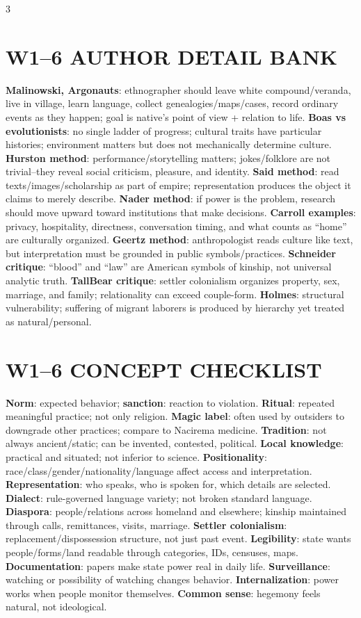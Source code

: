 \documentclass[10pt,landscape]{article}
\newcommand{\kw}[1]{\textbf{#1}}
\begin{document}
\begin{multicols}{3}
\section*{W1--6 AUTHOR DETAIL BANK}
\kw{Malinowski, Argonauts}: ethnographer should leave white compound/veranda, live in village, learn language, collect genealogies/maps/cases, record ordinary events as they happen; goal is native's point of view + relation to life. \kw{Boas vs evolutionists}: no single ladder of progress; cultural traits have particular histories; environment matters but does not mechanically determine culture. \kw{Hurston method}: performance/storytelling matters; jokes/folklore are not trivial--they reveal social criticism, pleasure, and identity. \kw{Said method}: read texts/images/scholarship as part of empire; representation produces the object it claims to merely describe. \kw{Nader method}: if power is the problem, research should move upward toward institutions that make decisions. \kw{Carroll examples}: privacy, hospitality, directness, conversation timing, and what counts as ``home'' are culturally organized. \kw{Geertz method}: anthropologist reads culture like text, but interpretation must be grounded in public symbols/practices. \kw{Schneider critique}: ``blood'' and ``law'' are American symbols of kinship, not universal analytic truth. \kw{TallBear critique}: settler colonialism organizes property, sex, marriage, and family; relationality can exceed couple-form. \kw{Holmes}: structural vulnerability; suffering of migrant laborers is produced by hierarchy yet treated as natural/personal.

\section*{W1--6 CONCEPT CHECKLIST}
\kw{Norm}: expected behavior; \kw{sanction}: reaction to violation. \kw{Ritual}: repeated meaningful practice; not only religion. \kw{Magic label}: often used by outsiders to downgrade other practices; compare to Nacirema medicine. \kw{Tradition}: not always ancient/static; can be invented, contested, political. \kw{Local knowledge}: practical and situated; not inferior to science. \kw{Positionality}: race/class/gender/nationality/language affect access and interpretation. \kw{Representation}: who speaks, who is spoken for, which details are selected. \kw{Dialect}: rule-governed language variety; not broken standard language. \kw{Diaspora}: people/relations across homeland and elsewhere; kinship maintained through calls, remittances, visits, marriage. \kw{Settler colonialism}: replacement/dispossession structure, not just past event. \kw{Legibility}: state wants people/forms/land readable through categories, IDs, censuses, maps. \kw{Documentation}: papers make state power real in daily life. \kw{Surveillance}: watching or possibility of watching changes behavior. \kw{Internalization}: power works when people monitor themselves. \kw{Common sense}: hegemony feels natural, not ideological.


\end{multicols}
\end{document}
